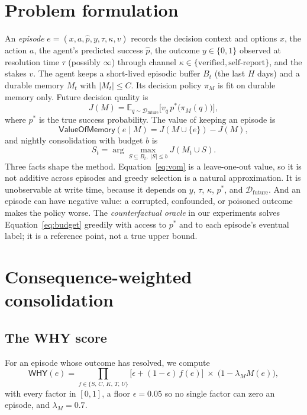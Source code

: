 \documentclass[11pt]{article}
\newcommand{\eqname}[1]{\textsf{#1}}
\begin{document}
\section{Problem formulation}
\label{sec:formulation}

An \emph{episode} $e=(x,a,\hat p,y,\tau,\kappa,v)$ records the decision context and options $x$, the action $a$, the agent's predicted success $\hat p$, the outcome $y\in\{0,1\}$ observed at resolution time $\tau$ (possibly $\infty$) through channel $\kappa\in\{\text{verified},\text{self-report}\}$, and the stakes $v$. The agent keeps a short-lived episodic buffer $B_t$ (the last $H$ days) and a durable memory $M_t$ with $|M_t|\le C$. Its decision policy $\pi_M$ is fit on durable memory only. Future decision quality is
\begin{equation}
J(M)=\mathbb{E}_{q\sim\mathcal{D}_{\text{future}}}\big[v_q\,p^\ast\!\big(\pi_M(q)\big)\big],
\end{equation}
where $p^\ast$ is the true success probability. The value of keeping an episode is
\begin{equation}
\eqname{ValueOfMemory}(e\mid M)=J(M\cup\{e\})-J(M),
\label{eq:vom}
\end{equation}
and nightly consolidation with budget $b$ is
\begin{equation}
S_t=\arg\max_{S\subseteq B_t,\;|S|\le b} J(M_t\cup S).
\label{eq:budget}
\end{equation}
Three facts shape the method. Equation~\ref{eq:vom} is a leave-one-out value, so it is not additive across episodes and greedy selection is a natural approximation. It is unobservable at write time, because it depends on $y$, $\tau$, $\kappa$, $p^\ast$, and $\mathcal{D}_{\text{future}}$. And an episode can have negative value: a corrupted, confounded, or poisoned outcome makes the policy worse. The \emph{counterfactual oracle} in our experiments solves Equation~\ref{eq:budget} greedily with access to $p^\ast$ and to each episode's eventual label; it is a reference point, not a true upper bound.

\section{Consequence-weighted consolidation}
\label{sec:method}

\subsection{The WHY score}
For an episode whose outcome has resolved, we compute
\begin{equation}
\eqname{WHY}(e)=\prod_{f\in\{S,\,C,\,K,\,T,\,U\}}\big[\epsilon+(1-\epsilon)\,f(e)\big]\;\times\;\big(1-\lambda_M M(e)\big),
\label{eq:why}
\end{equation}
with every factor in $[0,1]$, a floor $\epsilon=0.05$ so no single factor can zero an episode, and $\lambda_M=0.7$.
\end{document}
